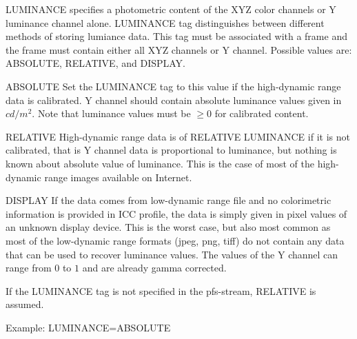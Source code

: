 \documentclass[a4paper,12pt,english]{article}
\begin{document}
 \begin{description}
 \item LUMINANCE specifies a photometric content of the XYZ color
   channels or Y luminance channel alone. LUMINANCE tag distinguishes
   between different methods of storing lumiance data. This tag must
   be associated with a frame and the frame must contain either all
   XYZ channels or Y channel. Possible values are: ABSOLUTE, RELATIVE,
   and DISPLAY.
   \begin{description}
   \item ABSOLUTE Set the LUMINANCE tag to this value if the high-dynamic
     range data is calibrated. Y channel should contain absolute
     luminance values given in $cd/m^2$. Note that luminance values
     must be $\geq0$ for calibrated content.
   \item RELATIVE High-dynamic range data is of RELATIVE LUMINANCE if
     it is not calibrated, that is Y channel data is proportional
     to luminance, but nothing is known about absolute value of
     luminance. This is the case of most of the high-dynamic range
     images available on Internet. 
   \item DISPLAY If the data comes from low-dynamic range file and no
     colorimetric information is provided in ICC profile, the data is
     simply given in pixel values of an unknown display device. This
     is the worst case, but also most common as most of the
     low-dynamic range formats (jpeg, png, tiff) do not contain any
     data that can be used to recover luminance values. The values of the Y
     channel can range from $0$ to $1$ and are already gamma
     corrected.
   \end{description}
   If the LUMINANCE tag is not specified in the pfs-stream, RELATIVE is assumed.

   Example: LUMINANCE=ABSOLUTE
   

\end{description}
\end{document}
